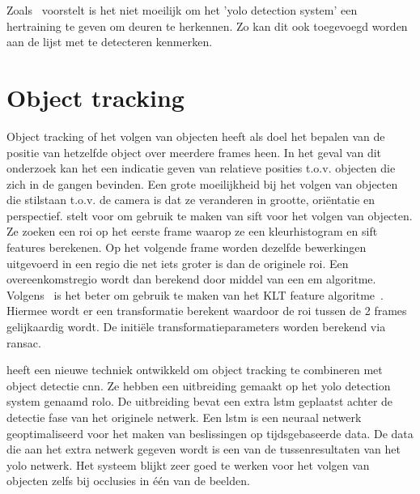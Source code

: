             Zoals~\cite{Llopart2017} voorstelt is het niet moeilijk om het '\gls{yolo} detection system' een hertraining te geven om deuren te herkennen. Zo kan dit ook toegevoegd worden aan de lijst met te detecteren kenmerken. 


    \section{Object tracking}
        Object tracking of het volgen van objecten heeft als doel het bepalen van de positie van hetzelfde object over meerdere frames heen. In het geval van dit onderzoek kan het een indicatie geven van relatieve posities t.o.v. objecten die zich in de gangen bevinden.
        Een grote moeilijkheid bij het volgen van objecten die stilstaan t.o.v. de camera is dat ze veranderen in grootte, ori\"{e}ntatie en perspectief.
        \cite{Zhou2009} stelt voor om gebruik te maken van \gls{sift} voor het volgen van objecten. Ze zoeken een \gls{roi} op het eerste frame waarop ze een kleurhistogram en \gls{sift} features berekenen.
        Op het volgende frame worden dezelfde bewerkingen uitgevoerd in een regio die net iets groter is dan de originele \gls{roi}. Een overeenkomstregio wordt dan berekend door middel van een \gls{em} algoritme.
        Volgens~\cite{Baheti2016} is het beter om gebruik te maken van het KLT feature algoritme~\cite{tomasi1991detection}. Hiermee wordt er een transformatie berekent waardoor de \gls{roi} tussen de 2 frames gelijkaardig wordt. De initi\"{e}le transformatieparameters worden berekend via \gls{ransac}.

        \cite{Ning2017} heeft een nieuwe techniek ontwikkeld om object tracking te combineren met object detectie \gls{cnn}. Ze hebben een uitbreiding gemaakt op het \gls{yolo} detection system genaamd \gls{rolo}.
        De uitbreiding bevat een extra \gls{lstm} geplaatst achter de detectie fase van het originele netwerk. Een \gls{lstm} is een neuraal netwerk geoptimaliseerd voor het maken van beslissingen op tijdsgebaseerde data.
        De data die aan het extra netwerk gegeven wordt is een van de tussenresultaten van het \gls{yolo} netwerk.
        Het systeem blijkt zeer goed te werken voor het volgen van objecten zelfs bij occlusies in \'{e}\'{e}n van de beelden. 

